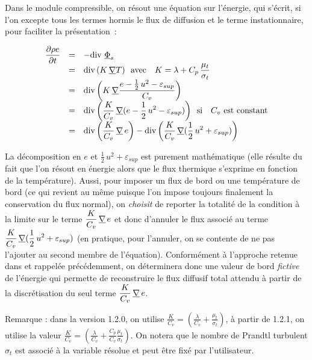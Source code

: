 Dans le module compressible, on r\'esout une \'equation sur l'\'energie, qui s'\'ecrit, si
l'on excepte tous les termes hormis le flux de diffusion et le terme
instationnaire, pour faciliter la pr\'esentation~:

\begin{equation}
\begin{array}{lll}
\displaystyle\frac{\partial \rho e}{\partial t} &=& - \text{div}\,{\,\underline{\Phi}_s}\\
&=& \displaystyle\text{div}\,{(K\,\underline{\nabla}{T})} \text{\ \ avec \ \ } K=\lambda+C_p\,\frac{\mu_t}{\sigma_t}\\
&=& \displaystyle\text{div}\,{\left(K\,\underline{\nabla}{\frac{e-\frac{1}{2}\,u^2-\varepsilon_{sup}}{C_v}}\right)} \\
&=& \displaystyle\text{div}\,{\left(\frac{K}{C_v}\,\underline{\nabla}{(e-\frac{1}{2}\,u^2-\varepsilon_{sup})}\right)} \text{\ \
si \ \ } C_v \text{\ est constant}\\
&=& \displaystyle\text{div}\,{\left(\frac{K}{C_v}\,\underline{\nabla}\,e\right)}
-\text{div}\,{\left(\frac{K}{C_v}\,\underline{\nabla}{(\frac{1}{2}\,u^2+\varepsilon_{sup})}\right)} \\

\end{array}
\end{equation}

La d\'ecomposition en $e$ et $\frac{1}{2}\,u^2+\varepsilon_{sup}$ est purement
math\'ematique (elle r\'esulte du fait que l'on r\'esout en \'energie alors que
le flux thermique s'exprime en fonction de la temp\'erature). Aussi,  pour imposer un
flux de bord ou une temp\'erature de bord (ce qui revient au m\^eme puisque l'on
impose toujours finalement la conservation du flux normal), on {\it choisit}
de reporter la totalit\'e de la condition \`a la limite sur le terme
$\displaystyle\frac{K}{C_v}\,\underline{\nabla}\,e$
et donc d'annuler le flux associ\'e au terme
$\displaystyle\frac{K}{C_v}\,\underline{\nabla}{(\frac{1}{2}\,u^2+\varepsilon_{sup})}$
(en pratique, pour l'annuler, on se contente de ne pas l'ajouter
au second membre de l'\'equation). Conform\'ement \`a l'approche retenue dans \CS et
rappel\'ee pr\'ec\'edemment, on d\'eterminera donc une valeur de bord {\it
fictive} de l'\'energie qui permette de reconstruire le flux diffusif total
attendu \`a partir
de la discr\'etisation du seul terme $\displaystyle\frac{K}{C_v}\,\underline{\nabla}\,e$.

Remarque : dans la version 1.2.0,
on utilise $\displaystyle
\frac{K}{C_v}=\left(\frac{\lambda}{C_v}+\frac{\mu_t}{\sigma_t}\right)$, \`a
partir de 1.2.1, on utilise la valeur  $\displaystyle
\frac{K}{C_v}=\left(\frac{\lambda}{C_v}+\frac{C_p}{C_v}\frac{\mu_t}{\sigma_t}\right)$.
On notera que le nombre de Prandtl turbulent $\sigma_t$ est associ\'e \`a la variable
r\'esolue et peut \^etre fix\'e par l'utilisateur.


